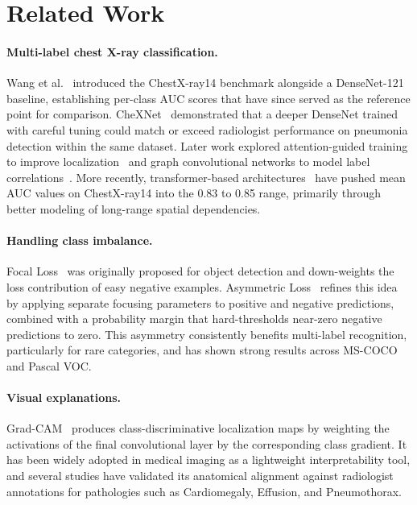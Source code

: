 \documentclass[runningheads]{llncs}
\begin{document}
\section{Related Work}
\label{sec:related}

\paragraph{Multi-label chest X-ray classification.}
Wang et al.~\cite{wang2017chestxray14} introduced the ChestX-ray14
benchmark alongside a DenseNet-121 baseline, establishing per-class
AUC scores that have since served as the reference point for
comparison. CheXNet~\cite{rajpurkar2017chexnet} demonstrated that
a deeper DenseNet trained with careful tuning could match or exceed
radiologist performance on pneumonia detection within the same
dataset. Later work explored attention-guided training to
improve localization~\cite{chen2019attention} and graph
convolutional networks to model label
correlations~\cite{chen2019gcn}. More recently, transformer-based
architectures~\cite{dosovitskiy2020vit,ma2021vit} have pushed mean
AUC values on ChestX-ray14 into the 0.83 to 0.85 range, primarily
through better modeling of long-range spatial dependencies.

\paragraph{Handling class imbalance.}
Focal Loss~\cite{lin2017focal} was originally proposed for object
detection and down-weights the loss contribution of easy negative
examples. Asymmetric Loss~\cite{ridnik2021asl} refines this idea
by applying separate focusing parameters to positive and negative
predictions, combined with a probability margin that hard-thresholds
near-zero negative predictions to zero. This asymmetry consistently
benefits multi-label recognition, particularly for rare categories,
and has shown strong results across MS-COCO and Pascal VOC.

\paragraph{Visual explanations.}
Grad-CAM~\cite{selvaraju2017gradcam} produces class-discriminative
localization maps by weighting the activations of the final
convolutional layer by the corresponding class gradient. It has
been widely adopted in medical imaging as a lightweight
interpretability tool, and several studies have validated its
anatomical alignment against radiologist annotations for pathologies
such as Cardiomegaly, Effusion, and Pneumothorax.
\end{document}
